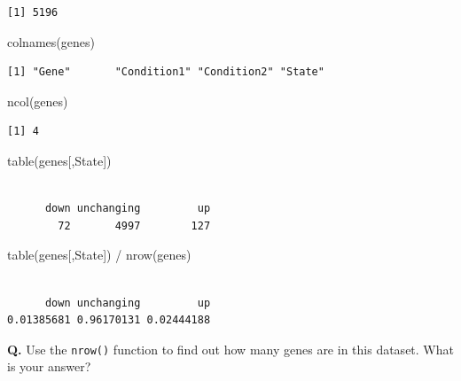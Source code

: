 \documentclass[
  letterpaper,
  DIV=11,
  numbers=noendperiod]{scrartcl}
\newenvironment{Shaded}{\begin{snugshade}}{\end{snugshade}}
\newcommand{\FunctionTok}[1]{\textcolor[rgb]{0.28,0.35,0.67}{#1}}
\newcommand{\NormalTok}[1]{\textcolor[rgb]{0.00,0.23,0.31}{#1}}
\newcommand{\SpecialCharTok}[1]{\textcolor[rgb]{0.37,0.37,0.37}{#1}}
\newcommand{\StringTok}[1]{\textcolor[rgb]{0.13,0.47,0.30}{#1}}
\begin{document}
\begin{verbatim}
[1] 5196
\end{verbatim}

\begin{Shaded}
\begin{Highlighting}[]
\FunctionTok{colnames}\NormalTok{(genes)}
\end{Highlighting}
\end{Shaded}

\begin{verbatim}
[1] "Gene"       "Condition1" "Condition2" "State"     
\end{verbatim}

\begin{Shaded}
\begin{Highlighting}[]
\FunctionTok{ncol}\NormalTok{(genes)}
\end{Highlighting}
\end{Shaded}

\begin{verbatim}
[1] 4
\end{verbatim}

\begin{Shaded}
\begin{Highlighting}[]
\FunctionTok{table}\NormalTok{(genes[,}\StringTok{\textquotesingle{}State\textquotesingle{}}\NormalTok{])}
\end{Highlighting}
\end{Shaded}

\begin{verbatim}

      down unchanging         up 
        72       4997        127 
\end{verbatim}

\begin{Shaded}
\begin{Highlighting}[]
\FunctionTok{table}\NormalTok{(genes[,}\StringTok{\textquotesingle{}State\textquotesingle{}}\NormalTok{]) }\SpecialCharTok{/} \FunctionTok{nrow}\NormalTok{(genes)}
\end{Highlighting}
\end{Shaded}

\begin{verbatim}

      down unchanging         up 
0.01385681 0.96170131 0.02444188 
\end{verbatim}

\textbf{Q.} Use the \texttt{nrow()} function to find out how many genes
are in this dataset. What is your answer?
\end{document}
